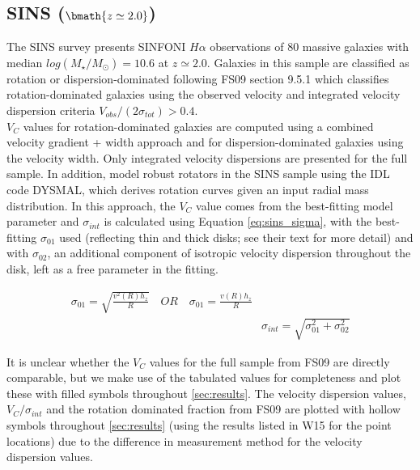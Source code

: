 \documentclass[fleqn,usenatbib]{mnras}
\begin{document}
\subsection{SINS ($\bmath{z\simeq2.0}$)}\label{subsec:SINS}
The SINS survey \citep[FS09]{ForsterSchreiber2009} presents SINFONI $H\alpha$ observations of 80 massive galaxies with median $log(M_{\star}/M_{\odot})=10.6$ at $z\simeq2.0$.
Galaxies in this sample are classified as rotation or dispersion-dominated following FS09 section 9.5.1 which classifies rotation-dominated galaxies using the observed velocity and integrated velocity dispersion criteria $V_{obs}/(2\sigma_{tot}) > 0.4$. \\

\noindent
$V_{C}$ values for rotation-dominated galaxies are computed using a combined velocity gradient + width approach \citep{ForsterSchreiber2006} and for dispersion-dominated galaxies using the velocity width.
Only integrated velocity dispersions are presented for the full sample.
In addition, \citep[C09]{Cresci2009} model robust rotators in the SINS sample using the IDL code DYSMAL, which derives rotation curves given an input radial mass distribution.
In this approach, the $V_{C}$ value comes from the best-fitting model parameter and $\sigma_{int}$ is calculated using Equation \ref{eq:sins_sigma}, with the best-fitting $\sigma_{01}$ used (reflecting thin and thick disks; see their text for more detail) and with $\sigma_{02}$, an additional component of isotropic velocity dispersion throughout the disk, left as a free parameter in the fitting.

\begin{equation}\label{eq:sins_sigma}
\begin{split}
\sigma_{01} = \sqrt{\frac{v^{2}(R)h_{z}}{R}} \quad OR \quad \sigma_{01} = \frac{v(R)h_{z}}{R} \\
& \sigma_{int} = \sqrt{\sigma_{01}^{2} + \sigma_{02}^{2}}
\end{split}
\end{equation}

\noindent
It is unclear whether the $V_{C}$ values for the full sample from FS09 are directly comparable, but we make use of the tabulated values for completeness and plot these with filled symbols throughout \cref{sec:results}.
The velocity dispersion values, $V_{C}/\sigma_{int}$ and the rotation dominated fraction from FS09 are plotted with hollow symbols throughout \cref{sec:results} (using the results listed in W15 for the point locations) due to the difference in measurement method for the velocity dispersion values.
\end{document}
